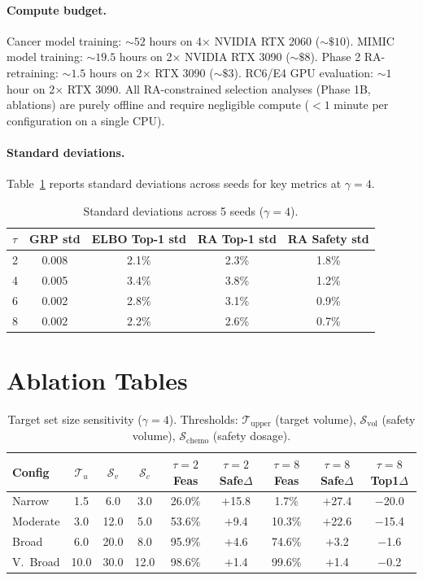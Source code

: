 \documentclass{article}
\newcommand{\cT}{\mathcal{T}}
\newcommand{\cS}{\mathcal{S}}
\begin{document}
\paragraph{Compute budget.} Cancer model training: ${\sim}52$ hours on 4$\times$ NVIDIA RTX 2060 (${\sim}\$10$). MIMIC model training: ${\sim}19.5$ hours on 2$\times$ NVIDIA RTX 3090 (${\sim}\$8$). Phase 2 RA-retraining: ${\sim}1.5$ hours on 2$\times$ RTX 3090 (${\sim}\$3$). RC6/E4 GPU evaluation: ${\sim}1$ hour on 2$\times$ RTX 3090. All RA-constrained selection analyses (Phase 1B, ablations) are purely offline and require negligible compute ($< 1$ minute per configuration on a single CPU).

\paragraph{Standard deviations.} Table~\ref{tab:std} reports standard deviations across seeds for key metrics at $\gamma = 4$.

\begin{table}[h]
\centering
\caption{Standard deviations across 5 seeds ($\gamma = 4$).}
\label{tab:std}
\small
\begin{tabular}{l c c c c}
\toprule
$\tau$ & GRP std & ELBO Top-1 std & RA Top-1 std & RA Safety std \\
\midrule
2 & 0.008 & 2.1\% & 2.3\% & 1.8\% \\
4 & 0.005 & 3.4\% & 3.8\% & 1.2\% \\
6 & 0.002 & 2.8\% & 3.1\% & 0.9\% \\
8 & 0.002 & 2.2\% & 2.6\% & 0.7\% \\
\bottomrule
\end{tabular}
\end{table}


\section{Ablation Tables}
\label{app:ablation_tables}

\begin{table}[h]
\centering
\caption{Target set size sensitivity ($\gamma = 4$). Thresholds: $\cT_{\text{upper}}$ (target volume), $\cS_{\text{vol}}$ (safety volume), $\cS_{\text{chemo}}$ (safety dosage).}
\label{tab:target_size}
\small
\begin{tabular}{l c c c c c c c c}
\toprule
Config & $\cT_u$ & $\cS_v$ & $\cS_c$ & $\tau{=}2$ Feas & $\tau{=}2$ Safe$\Delta$ & $\tau{=}8$ Feas & $\tau{=}8$ Safe$\Delta$ & $\tau{=}8$ Top1$\Delta$ \\
\midrule
Narrow & 1.5 & 6.0 & 3.0 & 26.0\% & $+$15.8 & 1.7\% & $+$27.4 & $-$20.0 \\
Moderate & 3.0 & 12.0 & 5.0 & 53.6\% & $+$9.4 & 10.3\% & $+$22.6 & $-$15.4 \\
Broad & 6.0 & 20.0 & 8.0 & 95.9\% & $+$4.6 & 74.6\% & $+$3.2 & $-$1.6 \\
V.~Broad & 10.0 & 30.0 & 12.0 & 98.6\% & $+$1.4 & 99.6\% & $+$1.4 & $-$0.2 \\
\bottomrule
\end{tabular}
\end{table}
\end{document}
